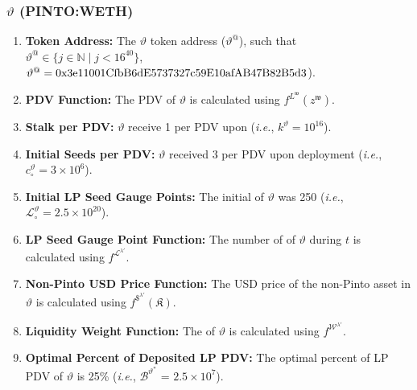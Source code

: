 \documentclass[class=article, crop=false]{standalone}
\begin{document}

\vspace{0.2cm}
\subsubsection{$\vartheta$ (PINTO:WETH)}
\vspace{0.2cm}

\begin{enumerate}

    \item \textbf{Token Address:} The $\vartheta$ token address ($\vartheta^{@}$), such that $\vartheta^{@} \in \{j \in \mathbb{N} \mid j < 16^{40} \}$, $\vartheta^{@} = \\ \text{0x3e11001CfbB6dE5737327c59E10afAB47B82B5d3}$).
    
    \item \textbf{PDV Function:} The PDV of $\vartheta$ is calculated using $f^{L^{\mathfrak{w}}}(z^{\mathfrak{w}})$.
                
    \item \textbf{Stalk per PDV:} $\vartheta$  receive 1  per PDV upon  (\textit{i.e.}, $k^{\vartheta} = 10^{16}$).
    
    \item \textbf{Initial Seeds per PDV:} $\vartheta$  received 3  per PDV upon deployment  (\textit{i.e.}, ${c_{\circ}^{\vartheta}} = 3 \times 10^6$).

    \item \textbf{Initial LP Seed Gauge Points:} The initial  of $\vartheta$ was 250 (\textit{i.e.}, $\mathscr{L}_{\circ}^{\vartheta} = 2.5 \times 10^{20}$).
    
    \item \textbf{LP Seed Gauge Point Function:} The number of  of $\vartheta$ during $t$ is calculated using $f^{\mathscr{L}^{\lambda'}}$.

    \item \textbf{Non-Pinto USD Price Function:} The USD price of the non-Pinto asset in $\vartheta$ is calculated using $f^{\$^{\lambda'}}(\mathfrak{K})$.

    \item \textbf{Liquidity Weight Function:} The  of $\vartheta$ is calculated using $f^{\mathscr{W}^{\lambda'}}$.
    
    \item \textbf{Optimal Percent of Deposited LP PDV:} The optimal percent of  LP PDV of $\vartheta$ is 25\% (\textit{i.e.}, $\mathscr{B}^{\vartheta^{*}}$ = $2.5 \times 10^{7}$).


\end{enumerate}
\end{document}
